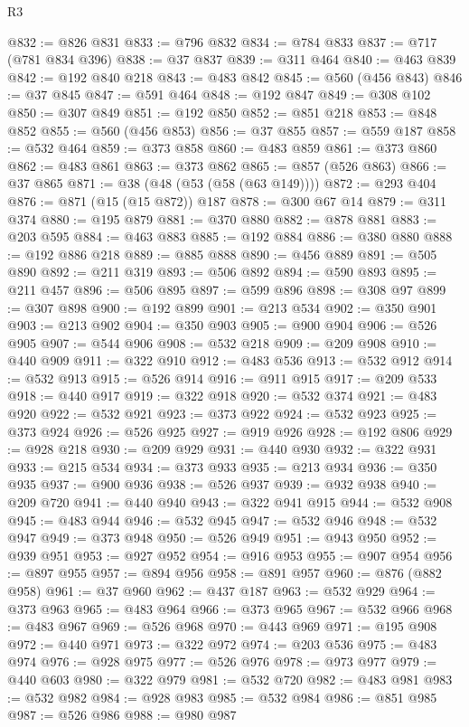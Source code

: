 \begin{lexlean}{R3}
\begin{coremodule}
@832 := @826 @831
@833 := @796 @832
@834 := @784 @833
@837 := @717 (@781 @834 @396)
@838 := @37 @837
@839 := @311 @464
@840 := @463 @839
@842 := @192 @840 @218
@843 := @483 @842
@845 := @560 (@456 @843)
@846 := @37 @845
@847 := @591 @464
@848 := @192 @847
@849 := @308 @102
@850 := @307 @849
@851 := @192 @850
@852 := @851 @218
@853 := @848 @852
@855 := @560 (@456 @853)
@856 := @37 @855
@857 := @559 @187
@858 := @532 @464
@859 := @373 @858
@860 := @483 @859
@861 := @373 @860
@862 := @483 @861
@863 := @373 @862
@865 := @857 (@526 @863)
@866 := @37 @865
@871 := @38 (@48 (@53 (@58 (@63 @149))))
@872 := @293 @404
@876 := @871 (@15 (@15 @872)) @187
@878 := @300 @67 @14
@879 := @311 @374
@880 := @195 @879
@881 := @370 @880
@882 := @878 @881
@883 := @203 @595
@884 := @463 @883
@885 := @192 @884
@886 := @380 @880
@888 := @192 @886 @218
@889 := @885 @888
@890 := @456 @889
@891 := @505 @890
@892 := @211 @319
@893 := @506 @892
@894 := @590 @893
@895 := @211 @457
@896 := @506 @895
@897 := @599 @896
@898 := @308 @97
@899 := @307 @898
@900 := @192 @899
@901 := @213 @534
@902 := @350 @901
@903 := @213 @902
@904 := @350 @903
@905 := @900 @904
@906 := @526 @905
@907 := @544 @906
@908 := @532 @218
@909 := @209 @908
@910 := @440 @909
@911 := @322 @910
@912 := @483 @536
@913 := @532 @912
@914 := @532 @913
@915 := @526 @914
@916 := @911 @915
@917 := @209 @533
@918 := @440 @917
@919 := @322 @918
@920 := @532 @374
@921 := @483 @920
@922 := @532 @921
@923 := @373 @922
@924 := @532 @923
@925 := @373 @924
@926 := @526 @925
@927 := @919 @926
@928 := @192 @806
@929 := @928 @218
@930 := @209 @929
@931 := @440 @930
@932 := @322 @931
@933 := @215 @534
@934 := @373 @933
@935 := @213 @934
@936 := @350 @935
@937 := @900 @936
@938 := @526 @937
@939 := @932 @938
@940 := @209 @720
@941 := @440 @940
@943 := @322 @941 @915
@944 := @532 @908
@945 := @483 @944
@946 := @532 @945
@947 := @532 @946
@948 := @532 @947
@949 := @373 @948
@950 := @526 @949
@951 := @943 @950
@952 := @939 @951
@953 := @927 @952
@954 := @916 @953
@955 := @907 @954
@956 := @897 @955
@957 := @894 @956
@958 := @891 @957
@960 := @876 (@882 @958)
@961 := @37 @960
@962 := @437 @187
@963 := @532 @929
@964 := @373 @963
@965 := @483 @964
@966 := @373 @965
@967 := @532 @966
@968 := @483 @967
@969 := @526 @968
@970 := @443 @969
@971 := @195 @908
@972 := @440 @971
@973 := @322 @972
@974 := @203 @536
@975 := @483 @974
@976 := @928 @975
@977 := @526 @976
@978 := @973 @977
@979 := @440 @603
@980 := @322 @979
@981 := @532 @720
@982 := @483 @981
@983 := @532 @982
@984 := @928 @983
@985 := @532 @984
@986 := @851 @985
@987 := @526 @986
@988 := @980 @987

\end{coremodule}
\end{lexlean}
